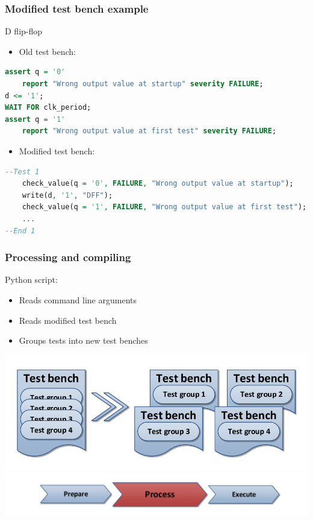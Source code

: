 \documentclass[british,10pt]{beamer}
\begin{document}
\begin{frame}[fragile]\frametitle{Modified test bench example}
D flip-flop
\begin{itemize}
\item Old test bench:
\end{itemize}
\begin{lstlisting}[language=VHDL, tabsize=4, frame=single, framesep=2mm, belowskip=5pt, aboveskip=5pt, showstringspaces=false, basicstyle=\scriptsize]
assert q = '0'
    report "Wrong output value at startup" severity FAILURE;
d <= '1';
WAIT FOR clk_period;
assert q = '1'
    report "Wrong output value at first test" severity FAILURE;
\end{lstlisting}
\vskip1pt
\begin{itemize}
\item Modified test bench:
\end{itemize}
\begin{lstlisting}[language=VHDL, tabsize=4, frame=single, framesep=2mm, belowskip=5pt, aboveskip=5pt, showstringspaces=false, basicstyle=\scriptsize]
--Test 1
    check_value(q = '0', FAILURE, "Wrong output value at startup");
    write(d, '1', "DFF");
    check_value(q = '1', FAILURE, "Wrong output value at first test");
    ...
--End 1
\end{lstlisting}
\end{frame}


\begin{frame}\frametitle{Processing and compiling}
\vskip20pt
Python script:
\begin{itemize}
\item Reads command line arguments
\item Reads modified test bench
\item Groups tests into new test benches
\end{itemize}
\vskip5pt
\centering
\includegraphics[width=.8\textwidth]{images/tbsplit.pdf}
\vskip20pt
\includegraphics[width=.7\textwidth]{images/ppe2.pdf}
\end{frame}
\end{document}

